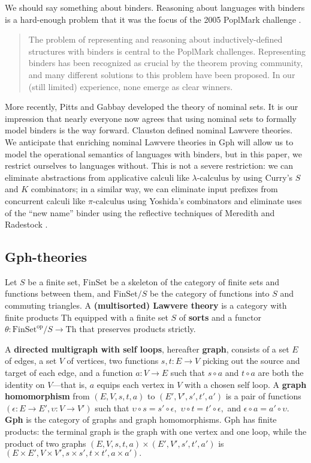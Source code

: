 \documentclass[a4paper,UKenglish]{article}
\newcommand{\maps}{\colon}
\newcommand{\Th}{\mathrm{Th}}
\newcommand{\FinSet}{\mathrm{FinSet}}
\newcommand{\op}{\mathrm{op}}
\newcommand{\pic}{$\pi\mbox{-calculus}$\xspace}
\newcommand{\lac}{$\lambda\mbox{-calculus}$\xspace}
\begin{document}
We should say something about binders.  Reasoning about languages with binders is a hard-enough problem that it was the focus of the 2005 PoplMark challenge \cite{PoplMark}.
\begin{quote}
  The problem of representing and reasoning about inductively-defined structures with binders is central to the PoplMark challenges. Representing binders has been recognized as crucial by the theorem proving community, and many different solutions to this problem have been proposed. In our (still limited) experience, none emerge as clear winners.
\end{quote}
More recently, Pitts and Gabbay \cite{PittsGabbay} developed the theory of nominal sets.  It is our impression that nearly everyone now agrees that using nominal sets to formally model binders is the way forward.  Clauston \cite{Clauston}
defined nominal Lawvere theories.  We anticipate that enriching nominal Lawvere theories in Gph will allow us to model the operational semantics of languages with binders, but in this paper, we restrict ourselves to languages without.  This is not a severe restriction: we can eliminate abstractions from applicative calculi like \lac by using Curry's $S$ and $K$ combinators; in a similar way, we can eliminate input prefixes from concurrent calculi like \pic using Yoshida's combinators \cite{Yoshida} and eliminate uses of the ``new name'' binder using the reflective techniques of Meredith and Radestock \cite{MeredithRadestock}.


\subsection{Gph-theories}

Let $S$ be a finite set, $\FinSet$ be a skeleton of the category of finite sets and functions between them, and $\FinSet/S$ be the category of functions into $S$ and commuting triangles.  A {\bf (multisorted) Lawvere theory} is a category with finite products Th equipped with a finite set $S$ of {\bf sorts} and a functor $\theta\maps \FinSet^{\op}/S \to \Th$ that preserves products strictly.

A {\bf directed multigraph with self loops}, hereafter {\bf graph}, consists of a set $E$ of edges, a set $V$ of vertices, two functions $s,t\maps E \to V$ picking out the source and target of each edge, and a function $a\maps V \to E$ such that $s\circ a$ and $t \circ a$ are both the identity on $V$---that is, $a$ equips each vertex in $V$ with a chosen self loop.  A {\bf graph homomorphism} from $(E, V, s, t, a)$ to $(E', V', s', t', a')$ is a pair of functions $(\epsilon\maps E \to E', \upsilon\maps V \to V')$ such that $\upsilon\circ s = s' \circ \epsilon,$ $\upsilon\circ t = t' \circ \epsilon,$ and $\epsilon \circ a = a' \circ \upsilon.$  {\bf Gph} is the category of graphs and graph homomorphisms.  Gph has finite products: the terminal graph is the graph with one vertex and one loop, while the product of two graphs $(E, V, s, t, a) \times (E', V', s', t', a')$ is $(E \times E', V \times V', s \times s', t\times t', a \times a').$
\end{document}
